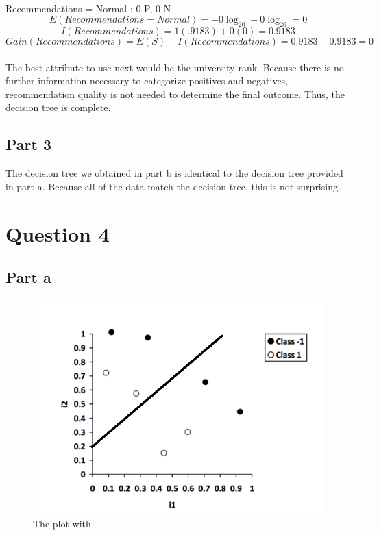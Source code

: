 \documentclass[12pt]{article}
\begin{document}
\\
Recommendations = Normal : 0 P, 0 N
\begin{equation}
E(Recommendations = Normal) = -0\log_20-0\log_20 = 0
\end{equation}
\begin{equation}
I(Recommendations) = 1(.9183)+0(0) = 0.9183
\end{equation}
\begin{equation}
Gain(Recommendations) = E(S) - I(Recommendations) = 0.9183 - 0.9183 = 0
\end{equation}
\\
The best attribute to use next would be the university rank. Because there is no further information necessary to categorize positives and negatives, recommendation quality is not needed to determine the final outcome. Thus, the decision tree is complete.

\subsection*{Part 3}

The decision tree we obtained in part b is identical to the decision tree provided in part a. Because all of the data match the decision tree, this is not surprising.

\section*{Question 4}

\subsection*{Part a}

\begin{figure}[H]
    \centering
    \includegraphics[width=1\textwidth]{question_3_plot_a}
    \caption{The plot with }
    \label{fig:question_3_plot_a}
\end{figure}
\end{document}
